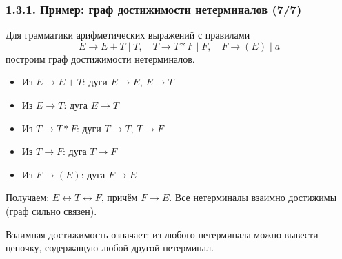 \begin{frame}
\frametitle{1.3.1. Пример: граф достижимости нетерминалов (7/7)}

\begin{example}
Для грамматики арифметических выражений с правилами
\[
E \to E + T \mid T, \quad T \to T * F \mid F, \quad F \to (E) \mid a
\]
построим граф достижимости нетерминалов.

\begin{itemize}
\item Из $E \to E + T$: дуги $E \to E$, $E \to T$
\item Из $E \to T$: дуга $E \to T$
\item Из $T \to T * F$: дуги $T \to T$, $T \to F$
\item Из $T \to F$: дуга $T \to F$
\item Из $F \to (E)$: дуга $F \to E$
\end{itemize}

Получаем: $E \leftrightarrow T \leftrightarrow F$, причём $F \to E$.
Все нетерминалы взаимно достижимы (граф сильно связен).
\end{example}

\begin{remark}
Взаимная достижимость означает: из любого нетерминала можно вывести цепочку, 
содержащую любой другой нетерминал.
\end{remark}

\end{frame}


